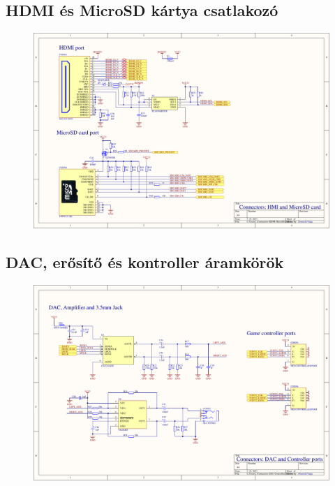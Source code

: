 \subsection{HDMI és MicroSD kártya csatlakozó}
\begin{figure}[H]
	\centering
	\includegraphics[width=220mm, keepaspectratio, angle=90]{figures/HDMI-MicroSDcard}
	\label{fig:HDMI-MicroSDcard}
\end{figure}
\subsection{DAC, erősítő és kontroller áramkörök}
\begin{figure}[H]
	\centering
	\includegraphics[width=220mm, keepaspectratio, angle=90]{figures/DAC-CONTROLLER}
	\label{fig:DAC-controllers}
\end{figure}
